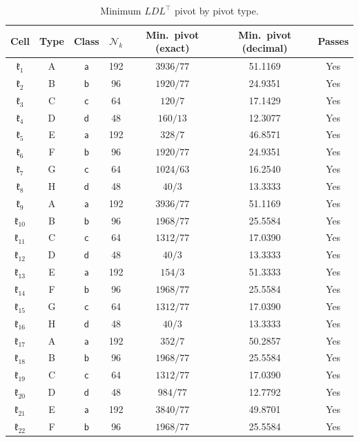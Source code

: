 \documentclass[11pt,reqno]{amsart}
\renewcommand{\_}{\origunderscore\allowbreak}
\numberwithin{equation}{section}
\theoremstyle{plain}
\theoremstyle{definition}
\theoremstyle{remark}
\newcommand{\Cell}[1]{\mathfrak{k}_{#1}}     %
\newcommand{\norm}[1]{\mathcal{N}_{#1}}      %
\begin{document}
\begin{table}[t]
\centering
\renewcommand{\arraystretch}{1.15}
\caption{Minimum $LDL^\top$ pivot by pivot type.}\label{tab:pivots}
\begin{tabular}{ccccccc}
\toprule
Cell & Type & Class & $\norm{k}$ & Min.\ pivot (exact) & Min.\ pivot (decimal) & Passes \\
\midrule
$\Cell{1}$ & A & $\mathsf a$ & 192 & $3936/77$ & 51.1169 & Yes \\
$\Cell{2}$ & B & $\mathsf b$ & 96 & $1920/77$ & 24.9351 & Yes \\
$\Cell{3}$ & C & $\mathsf c$ & 64 & $120/7$ & 17.1429 & Yes \\
$\Cell{4}$ & D & $\mathsf d$ & 48 & $160/13$ & 12.3077 & Yes \\
$\Cell{5}$ & E & $\mathsf a$ & 192 & $328/7$ & 46.8571 & Yes \\
$\Cell{6}$ & F & $\mathsf b$ & 96 & $1920/77$ & 24.9351 & Yes \\
$\Cell{7}$ & G & $\mathsf c$ & 64 & $1024/63$ & 16.2540 & Yes \\
$\Cell{8}$ & H & $\mathsf d$ & 48 & $40/3$ & 13.3333 & Yes \\
$\Cell{9}$ & A & $\mathsf a$ & 192 & $3936/77$ & 51.1169 & Yes \\
$\Cell{10}$ & B & $\mathsf b$ & 96 & $1968/77$ & 25.5584 & Yes \\
$\Cell{11}$ & C & $\mathsf c$ & 64 & $1312/77$ & 17.0390 & Yes \\
$\Cell{12}$ & D & $\mathsf d$ & 48 & $40/3$ & 13.3333 & Yes \\
$\Cell{13}$ & E & $\mathsf a$ & 192 & $154/3$ & 51.3333 & Yes \\
$\Cell{14}$ & F & $\mathsf b$ & 96 & $1968/77$ & 25.5584 & Yes \\
$\Cell{15}$ & G & $\mathsf c$ & 64 & $1312/77$ & 17.0390 & Yes \\
$\Cell{16}$ & H & $\mathsf d$ & 48 & $40/3$ & 13.3333 & Yes \\
$\Cell{17}$ & A & $\mathsf a$ & 192 & $352/7$ & 50.2857 & Yes \\
$\Cell{18}$ & B & $\mathsf b$ & 96 & $1968/77$ & 25.5584 & Yes \\
$\Cell{19}$ & C & $\mathsf c$ & 64 & $1312/77$ & 17.0390 & Yes \\
$\Cell{20}$ & D & $\mathsf d$ & 48 & $984/77$ & 12.7792 & Yes \\
$\Cell{21}$ & E & $\mathsf a$ & 192 & $3840/77$ & 49.8701 & Yes \\
$\Cell{22}$ & F & $\mathsf b$ & 96 & $1968/77$ & 25.5584 & Yes \\
\bottomrule
\end{tabular}
\end{table}
\end{document}

